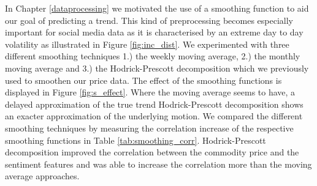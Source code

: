 \hfill
In Chapter \ref{dataprocessing} we motivated the use of a smoothing function to aid our goal of predicting a trend. This kind of preprocessing becomes especially important for social media data as it is characterised by an extreme day to day volatility as illustrated in Figure \ref{fig:inc_dist}. We experimented with three different smoothing techniques 1.) the weekly moving average, 2.) the monthly moving average and 3.) the Hodrick-Prescott decomposition which we previously used to smoothen our price data. The effect of the smoothing functions is displayed in Figure \ref{fig:s_effect}. Where the moving average seems to have, a delayed approximation of the true trend Hodrick-Prescott decomposition shows an exacter approximation of the underlying motion. We compared the different smoothing techniques by measuring the correlation increase of the respective smoothing functions in Table \ref{tab:smoothing_corr}. Hodrick-Prescott decomposition improved the correlation between the commodity price and the sentiment features and was able to increase the correlation more than the moving average approaches. 



